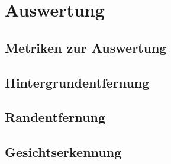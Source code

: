 \chapter{Auswertung}

\section{Metriken zur Auswertung}

\section{Hintergrundentfernung}

\section{Randentfernung}

\section{Gesichtserkennung}
